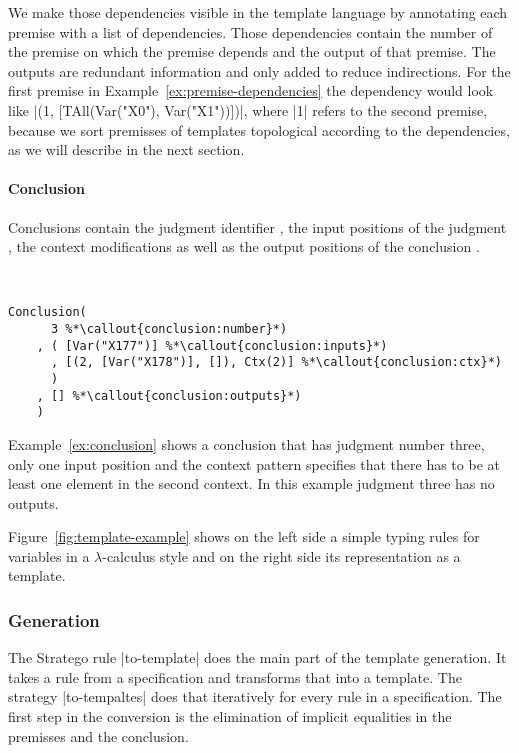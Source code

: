 We make those dependencies visible in the template language by
annotating each premise with a list of dependencies. Those
dependencies contain the number of the premise on which the premise
depends and the output of that premise. The outputs are redundant
information and only added to reduce indirections.
For the first premise in Example~\ref{ex:premise-dependencies} the
dependency would look like
\code|(1, [TAll(Var("X0"), Var("X1"))])|, where \code|1| refers to
the second premise, because we sort premisses of templates topological
according to the dependencies, as we will describe in the next
section.

\paragraph{Conclusion}
Conclusions contain the judgment identifier
, the input positions of the judgment
, the context modifications
 as well as the output positions of the
conclusion .

\begin{example}{~}
\begin{lstlisting}[language=sltc]
Conclusion(
      3 %*\callout{conclusion:number}*)
    , ( [Var("X177")] %*\callout{conclusion:inputs}*)
      , [(2, [Var("X178")], []), Ctx(2)] %*\callout{conclusion:ctx}*)
      )
    , [] %*\callout{conclusion:outputs}*)
    )
\end{lstlisting}
\label{ex:conclusion}
\end{example}

Example~\ref{ex:conclusion} shows a conclusion that has judgment
number three, only one input position and the context pattern
specifies that there has to be at least one element in the second
context. In this example judgment three has no outputs.

Figure~\ref{fig:template-example} shows on the left side a simple
typing rules for variables in a $\lambda$-calculus style and on the
right side its representation as a template.

\subsubsection{Generation}
The Stratego rule \code|to-template| does the main part of the
template generation. It takes a rule from a specification and
transforms that into a template. The strategy \code|to-tempaltes| does
that iteratively for every rule in a specification. The first step in
the conversion is the elimination of implicit equalities in the
premisses and the conclusion.

